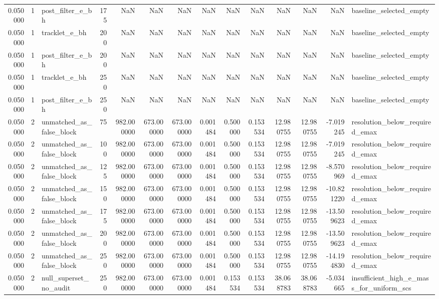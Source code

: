 \begin{tabular}{rrlrrrrrrrrrrl}
0.050000 & 1 & post_filter_e_bh & 175 & NaN & NaN & NaN & NaN & NaN & NaN & NaN & NaN & NaN & baseline_selected_empty \\
0.050000 & 1 & tracklet_e_bh & 200 & NaN & NaN & NaN & NaN & NaN & NaN & NaN & NaN & NaN & baseline_selected_empty \\
0.050000 & 1 & post_filter_e_bh & 200 & NaN & NaN & NaN & NaN & NaN & NaN & NaN & NaN & NaN & baseline_selected_empty \\
0.050000 & 1 & tracklet_e_bh & 250 & NaN & NaN & NaN & NaN & NaN & NaN & NaN & NaN & NaN & baseline_selected_empty \\
0.050000 & 1 & post_filter_e_bh & 250 & NaN & NaN & NaN & NaN & NaN & NaN & NaN & NaN & NaN & baseline_selected_empty \\
0.050000 & 2 & unmatched_as_false_block & 75 & 982.000000 & 673.000000 & 673.000000 & 0.001484 & 0.500000 & 0.153534 & 12.980755 & 12.980755 & -7.019245 & resolution_below_required_emax \\
0.050000 & 2 & unmatched_as_false_block & 100 & 982.000000 & 673.000000 & 673.000000 & 0.001484 & 0.500000 & 0.153534 & 12.980755 & 12.980755 & -7.019245 & resolution_below_required_emax \\
0.050000 & 2 & unmatched_as_false_block & 125 & 982.000000 & 673.000000 & 673.000000 & 0.001484 & 0.500000 & 0.153534 & 12.980755 & 12.980755 & -8.570969 & resolution_below_required_emax \\
0.050000 & 2 & unmatched_as_false_block & 150 & 982.000000 & 673.000000 & 673.000000 & 0.001484 & 0.500000 & 0.153534 & 12.980755 & 12.980755 & -10.821220 & resolution_below_required_emax \\
0.050000 & 2 & unmatched_as_false_block & 175 & 982.000000 & 673.000000 & 673.000000 & 0.001484 & 0.500000 & 0.153534 & 12.980755 & 12.980755 & -13.509623 & resolution_below_required_emax \\
0.050000 & 2 & unmatched_as_false_block & 200 & 982.000000 & 673.000000 & 673.000000 & 0.001484 & 0.500000 & 0.153534 & 12.980755 & 12.980755 & -13.509623 & resolution_below_required_emax \\
0.050000 & 2 & unmatched_as_false_block & 250 & 982.000000 & 673.000000 & 673.000000 & 0.001484 & 0.500000 & 0.153534 & 12.980755 & 12.980755 & -14.194830 & resolution_below_required_emax \\
0.050000 & 2 & null_superset_no_audit & 250 & 982.000000 & 673.000000 & 673.000000 & 0.001484 & 0.153534 & 0.153534 & 38.068783 & 38.068783 & -5.034665 & insufficient_high_e_mass_for_uniform_scs \\

\end{tabular}
